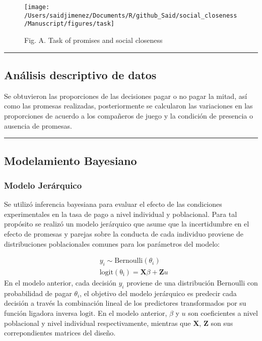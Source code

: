 \documentclass[]{article}
\begin{document}
\begin{figure}

{\centering \texttt{[image: /Users/saidjimenez/Documents/R/github\_Said/social\_closeness/Manuscript/figures/task]} 

}

\caption{Fig. A. Task of promises and social closeness}\label{fig:figA}
\end{figure}

\begin{center}\rule{0.5\linewidth}{\linethickness}\end{center}

\subsection{Análisis descriptivo de
datos}\label{analisis-descriptivo-de-datos}

Se obtuvieron las proporciones de las decisiones pagar o no pagar la
mitad, así como las promesas realizadas, posteriormente se calcularon
las variaciones en las proporciones de acuerdo a los compañeros de juego
y la condición de presencia o ausencia de promesas.

\begin{center}\rule{0.5\linewidth}{\linethickness}\end{center}

\subsection{Modelamiento Bayesiano}\label{modelamiento-bayesiano}

\subsubsection{Modelo Jerárquico}\label{modelo-jerarquico}

Se utilizó inferencia bayesiana para evaluar el efecto de las
condiciones experimentales en la tasa de pago a nivel individual y
poblacional. Para tal propósito se realizó un modelo jerárquico que
asume que la incertidumbre en el efecto de promesas y parejas sobre la
conducta de cada individuo proviene de distribuciones poblacionales
comunes para los parámetros del modelo:

\[
\begin{aligned}
&y_i \sim \mathrm{Bernoulli}(\theta_i) \\
&\mathrm{logit(\theta_i)} = \mathbf{X}\beta  +  \mathbf{Z}u
\end{aligned}
\] En el modelo anterior, cada decisión \(y_i\) proviene de una
distribución Bernoulli con probabilidad de pagar \(\theta_i\), el
objetivo del modelo jerárquico es predecir cada decisión a través la
combinación lineal de los predictores transformados por su función
ligadora inversa \(\mathrm{logit}\). En el modelo anterior, \(\beta\) y
\(u\) son coeficientes a nivel poblacional y nivel individual
respectivamente, mientras que \(\mathbf{X}\), \(\mathbf{Z}\) son sus
correpondientes matrices del diseño.
\end{document}
